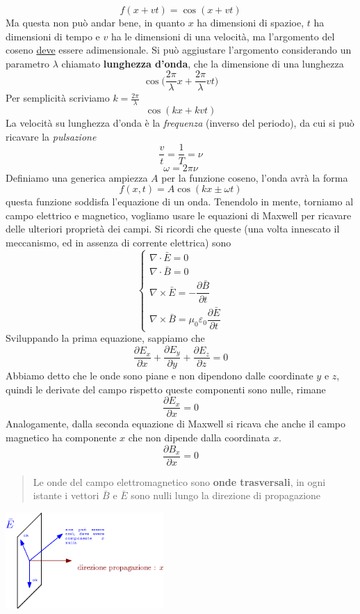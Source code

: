 \documentclass[10pt, letterpaper]{report}
\begin{document}
$$ f(x+vt)=\cos(x+vt)$$
Ma questa non può andar bene, in quanto $x$ ha dimensioni di spazioe, $t$ ha dimensioni di tempo e $v$ ha le dimensioni di una velocità, ma l'argomento del coseno \underline{deve} essere adimensionale. Si può aggiustare l'argomento considerando un parametro $\lambda$ chiamato \textbf{lunghezza d'onda}, che la dimensione di una lunghezza 
$$ 
\cos\big(\frac{2\pi}{\lambda}x+\frac{2\pi}{\lambda}vt\big)
$$
Per semplicità scriviamo $k=\frac{2\pi}{\lambda}$
$$ 
\cos(kx+kvt)
$$
La velocità su lunghezza d'onda è la \textit{frequenza} (inverso del periodo), da cui si può ricavare la \textit{pulsazione}
$$ 
\frac{v}{t}=\frac{1}{T}=\nu
$$
$$ \omega = 2\pi\nu$$
Definiamo una generica ampiezza $A$ per la funzione coseno, l'onda avrà la forma 
$$ f(x,t)=
A\cos(kx\pm\omega t)
$$
questa funzione soddisfa l'equazione di un onda. Tenendolo in mente, torniamo al campo elettrico e magnetico, vogliamo usare le equazioni di Maxwell per ricavare delle ulteriori proprietà dei campi. Si ricordi che queste (una volta innescato il meccanismo, ed in assenza di corrente elettrica) sono 
$$\begin{cases}
    \nabla \cdot \bar E = 0\\ 
    \nabla \cdot \bar B = 0\\ 
    \nabla \times \bar E = -\dfrac{\partial \bar B }{\partial t}\\ 
    \nabla \times \bar B = \mu_0 \varepsilon_0 \dfrac{\partial \bar E}{\partial t}
\end{cases} $$
Sviluppando la prima equazione, sappiamo che 
$$ \frac{\partial E_x}{\partial x}+ 
\frac{\partial E_y}{\partial y}+ 
\frac{\partial E_z}{\partial z}=0$$
Abbiamo detto che le onde sono piane e non dipendono dalle coordinate $y$ e $z$, quindi le derivate del campo rispetto queste componenti sono nulle, rimane
$$ \frac{\partial E_x}{\partial x}=0$$
Analogamente, dalla seconda equazione di Maxwell si ricava che anche il campo magnetico ha componente $x$ che non dipende dalla coordinata $x$.
$$ \frac{\partial B_x}{\partial x}=0$$
\begin{quote}
    Le onde del campo elettromagnetico sono \textbf{onde trasversali}, in ogni istante i vettori $\bar B$ e $\bar E$ sono nulli lungo la direzione di propagazione
\end{quote}
\begin{center}
    \includegraphics[width=0.45\textwidth]{images/ondeTrasversali.eps}
\end{center}
\end{document}
